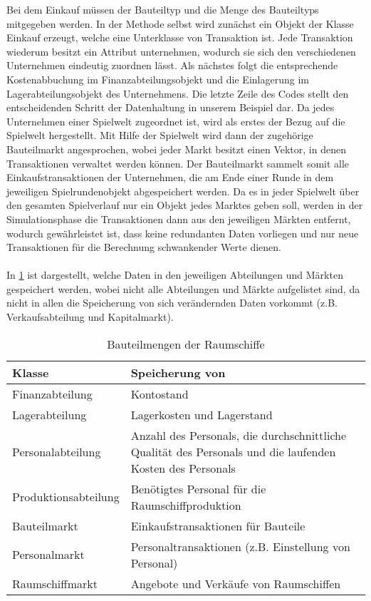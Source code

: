 Bei dem Einkauf müssen der Bauteiltyp und die Menge des Bauteiltyps mitgegeben werden. In der Methode selbst wird zunächst ein Objekt der Klasse Einkauf erzeugt, welche eine Unterklasse von Transaktion ist. Jede Transaktion wiederum besitzt ein Attribut unternehmen, wodurch sie sich den verschiedenen Unternehmen eindeutig zuordnen lässt. Als nächstes folgt die entsprechende Kostenabbuchung im Finanzabteilungsobjekt und die Einlagerung im Lagerabteilungsobjekt des Unternehmens. Die letzte Zeile des Codes stellt den entscheidenden Schritt der Datenhaltung in unserem Beispiel dar. Da jedes Unternehmen einer Spielwelt zugeordnet ist, wird als erstes der Bezug auf die Spielwelt hergestellt. Mit Hilfe der Spielwelt wird dann der zugehörige Bauteilmarkt angesprochen, wobei jeder Markt besitzt einen Vektor, in denen Transaktionen verwaltet werden können. Der Bauteilmarkt sammelt somit alle Einkaufstransaktionen der Unternehmen, die am Ende einer Runde in dem jeweiligen Spielrundenobjekt abgespeichert werden. Da es in jeder Spielwelt über den gesamten Spielverlauf nur ein Objekt jedes Marktes geben soll, werden in der Simulationsphase die Transaktionen dann aus den jeweiligen Märkten entfernt, wodurch gewährleistet ist, dass keine redundanten Daten vorliegen und nur neue Transaktionen für die Berechnung schwankender Werte dienen.
\\
\\
In \ref{tab:fachkonzept-implementierung-erläuterung-datenhaltung} ist dargestellt, welche Daten in den jeweiligen Abteilungen und Märkten gespeichert werden, wobei nicht alle Abteilungen und Märkte aufgelistet sind, da nicht in allen die Speicherung von sich verändernden Daten vorkommt (z.B. Verkaufsabteilung und Kapitalmarkt).

\begin{table}[ht]\small
     \centering
     \begin{tabular}{| p{4cm} |p{\textwidth -5cm} |}
          \hline
          Klasse & Speicherung von \\
          \hline \hline
          Finanzabteilung & Kontostand \\ \hline
          Lagerabteilung & Lagerkosten und Lagerstand  \\ \hline
          Personalabteilung & Anzahl des Personals, die durchschnittliche Qualität des Personals und die 			  laufenden Kosten des Personals \\ \hline
          Produktionsabteilung & Benötigtes Personal für die Raumschiffproduktion \\ \hline
          Bauteilmarkt & Einkaufstransaktionen für Bauteile \\ \hline
          Personalmarkt & Personaltransaktionen (z.B. Einstellung von Personal) \\ \hline
          Raumschiffmarkt & Angebote und Verkäufe von Raumschiffen \\ 
          \hline    
     \end{tabular}
     \caption{Bauteilmengen der Raumschiffe}
     \label{tab:fachkonzept-implementierung-erläuterung-datenhaltung}
\end{table}

